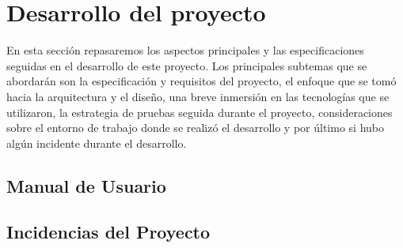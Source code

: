 \section{Desarrollo del proyecto}
En esta sección repasaremos los aspectos principales y las especificaciones seguidas 
en el desarrollo de este proyecto. Los principales subtemas que se abordarán son la 
especificación y requisitos del proyecto, el enfoque que se tomó hacia la arquitectura 
y el diseño, una breve inmersión en las tecnologías que se utilizaron, la estrategia de 
pruebas seguida durante el proyecto, consideraciones sobre el entorno de trabajo donde 
se realizó el desarrollo y por último si hubo algún incidente durante el desarrollo.






\subsection{Manual de Usuario}
\subsection{Incidencias del Proyecto}
\pagebreak